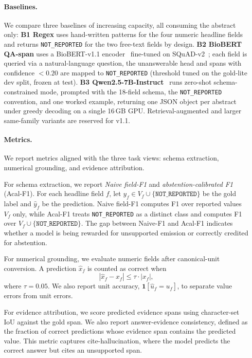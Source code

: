 \documentclass{article}
\newcommand{\NR}{\texttt{NOT\_REPORTED}}
\begin{document}
\paragraph{Baselines.}
We compare three baselines of increasing capacity, all consuming the abstract only:
\textbf{B1 Regex} uses hand-written patterns for the four numeric headline fields and returns \NR{} for the two free-text fields by design.
\textbf{B2 BioBERT QA-span} uses a BioBERT-v1.1 encoder~\citep{lee2020biobert} fine-tuned on SQuAD-v2~\citep{rajpurkar2018know}; each field is queried via a natural-language question, the unanswerable head and spans with confidence $<0.20$ are mapped to \NR{} (threshold tuned on the gold-lite dev split, frozen at test).
\textbf{B3 Qwen2.5-7B-Instruct}~\citep{qwen2024qwen25} runs zero-shot schema-constrained mode, prompted with the 18-field schema, the \NR{} convention, and one worked example, returning one JSON object per abstract under greedy decoding on a single 16\,GB GPU. Retrieval-augmented and larger same-family variants are reserved for v1.1.


\paragraph{Metrics.}
We report metrics aligned with the three task views: schema extraction, numerical grounding, and evidence attribution.

For schema extraction, we report \emph{Naive field-F1} and \emph{abstention-calibrated F1} (Acal-F1). For each headline field $f$, let $y_f \in V_f \cup \{\NR{}\}$ be the gold label and $\hat{y}_f$ be the prediction. Naive field-F1 computes F1 over reported values $V_f$ only, while Acal-F1 treats \NR{} as a distinct class and computes F1 over $V_f \cup \{\NR{}\}$. The gap between Naive-F1 and Acal-F1 indicates whether a model is being rewarded for unsupported emission or correctly credited for abstention.

For numerical grounding, we evaluate numeric fields after canonical-unit conversion. A prediction $\hat{x}_f$ is counted as correct when
\[
|\hat{x}_f - x_f| \le \tau \cdot |x_f|,
\]
where $\tau = 0.05$. We also report unit accuracy, $\mathbf{1}[\hat{u}_f = u_f]$, to separate value errors from unit errors.

For evidence attribution, we score predicted evidence spans using character-set IoU against the gold span. We also report answer-evidence consistency, defined as the fraction of correct predictions whose evidence span contains the predicted value. This metric captures cite-hallucination, where the model predicts the correct answer but cites an unsupported span.
\end{document}
